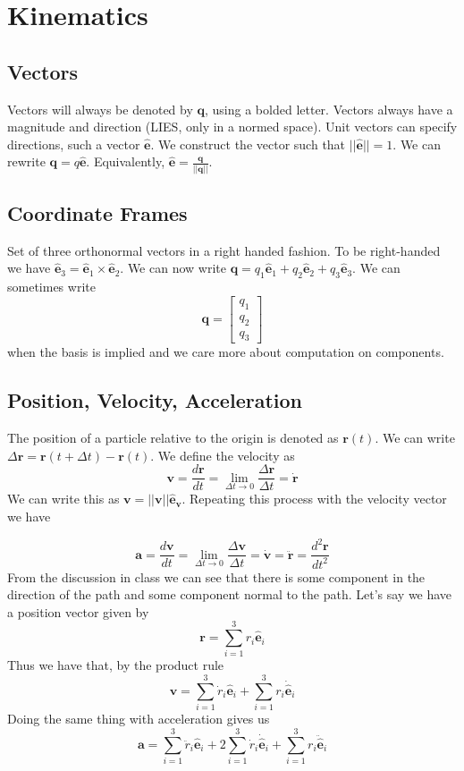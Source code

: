 \documentclass[a4paper]{article}
\begin{document}
\section*{Kinematics}

\subsection*{Vectors}
Vectors will always be denoted by $\mathbf{q}$, using a bolded letter. Vectors always have a magnitude and direction (LIES, only in a normed space). Unit vectors can specify directions, such a vector $\hat{\mathbf{e}}$. We construct the vector such that $||\hat{\mathbf{e}}|| = 1$. We can rewrite $\mathbf{q} = q\hat{\mathbf{e}}$. Equivalently, $\hat{\mathbf{e}} = \frac{\mathbf{q}}{||\mathbf{q}||}$.

\subsection*{Coordinate Frames}
Set of three orthonormal vectors in a right handed fashion. To be right-handed we have $\hat{\mathbf{e}}_3 = \hat{\mathbf{e}}_1 \times \hat{\mathbf{e}}_2$. We can now write $\mathbf{q} = q_1 \hat{\mathbf{e}}_1 + q_2 \hat{\mathbf{e}}_2 + q_3 \hat{\mathbf{e}}_3$. We can sometimes write
\[
    \mathbf{q} = 
    \begin{bmatrix}
        q_1 \\
        q_2 \\
        q_3
    \end{bmatrix}
\]
when the basis is implied and we care more about computation on components.

\subsection*{Position, Velocity, Acceleration}
The position of a particle relative to the origin is denoted as $\mathbf{r}(t)$. We can write $\Delta \mathbf{r} = \mathbf{r}(t + \Delta t) - \mathbf{r}(t)$. We define the velocity as 
\[
    \mathbf{v} = \frac{d\mathbf{r}}{dt} = \lim_{\Delta t \rightarrow 0} \frac{\Delta \mathbf{r}}{\Delta t} = \dot{\mathbf{r}}
\]
We can write this as $\mathbf{v} = ||\mathbf{v}||\hat{\mathbf{e}}_{\mathbf{v}}$. Repeating this process with the velocity vector we have

\[
    \mathbf{a} = \frac{d\mathbf{v}}{dt} = \lim_{\Delta t \rightarrow 0} \frac{\Delta \mathbf{v}}{\Delta t} = \dot{\mathbf{v}} = \ddot{\mathbf{r}} = \frac{d^2 \mathbf{r}}{dt^2}
\]
From the discussion in class we can see that there is some component in the direction of the path and some component normal to the path. Let's say we have a position vector given by 
\[
    \mathbf{r} = \sum_{i=1}^3 r_i \hat{\mathbf{e}}_i
\]
Thus we have that, by the product rule
\[
    \mathbf{v} = \sum_{i=1}^3 \dot{r}_i \hat{\mathbf{e}}_i + \sum_{i=1}^3 r_i \dot{\hat{\mathbf{e}}}_i
\]
Doing the same thing with acceleration gives us
\[
    \mathbf{a} = \sum_{i=1}^3 \ddot{r}_i \hat{\mathbf{e}}_i + 2\sum_{i=1}^3 \dot{r}_i\dot{\hat{\mathbf{e}}}_i + \sum_{i=1}^3 r_i \ddot{\hat{\mathbf{e}}}_i
\]
\end{document}
